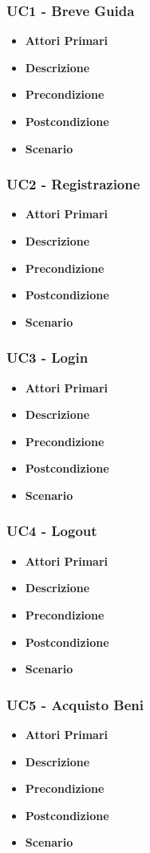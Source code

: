 \subsubsection{UC1 - Breve Guida}
\begin{itemize}
	\item \textbf{Attori Primari}
	\item \textbf{Descrizione}
	\item \textbf{Precondizione}
	\item \textbf{Postcondizione}
	\item \textbf{Scenario}
\end{itemize}
\subsubsection{UC2 - Registrazione}
\begin{itemize}
	\item \textbf{Attori Primari}
	\item \textbf{Descrizione}
	\item \textbf{Precondizione}
	\item \textbf{Postcondizione}
	\item \textbf{Scenario}
\end{itemize}
\subsubsection{UC3 - Login}
\begin{itemize}
	\item \textbf{Attori Primari}
	\item \textbf{Descrizione}
	\item \textbf{Precondizione}
	\item \textbf{Postcondizione}
	\item \textbf{Scenario}
\end{itemize}
\subsubsection{UC4 - Logout}
\begin{itemize}
	\item \textbf{Attori Primari}
	\item \textbf{Descrizione}
	\item \textbf{Precondizione}
	\item \textbf{Postcondizione}
	\item \textbf{Scenario}
\end{itemize}
\subsubsection{UC5 - Acquisto Beni}
\begin{itemize}
	\item \textbf{Attori Primari}
	\item \textbf{Descrizione}
	\item \textbf{Precondizione}
	\item \textbf{Postcondizione}
	\item \textbf{Scenario}
\end{itemize}
